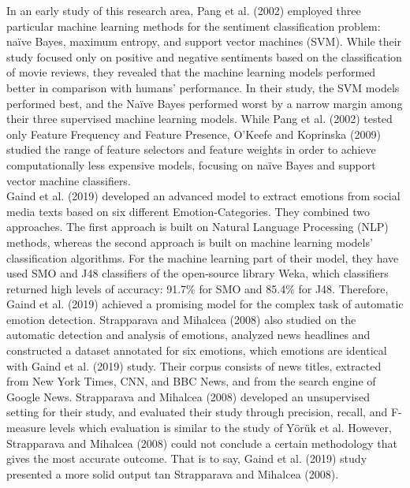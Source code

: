 \documentclass[a4paper]{article}
\begin{document}
In an early study of this research area, Pang et al. (2002) employed three particular machine learning methods for the sentiment classification problem: naïve Bayes, maximum entropy, and support vector machines (SVM). While their study focused only on positive and negative sentiments based on the classification of movie reviews, they revealed that the machine learning models performed better in comparison with humans’ performance. In their study, the SVM models performed best, and the Naïve Bayes performed worst by a narrow margin among their three supervised machine learning models. While Pang et al. (2002) tested only Feature Frequency and Feature Presence, O’Keefe and Koprinska (2009) studied the range of feature selectors and feature weights in order to achieve computationally less expensive models, focusing on naïve Bayes and support vector machine classifiers. \\
    
Gaind et al. (2019) developed an advanced model to extract emotions from social media texts based on six different Emotion-Categories. They combined two approaches. The first approach is built on Natural Language Processing (NLP) methods, whereas the second approach is built on machine learning models’ classification algorithms. For the machine learning part of their model, they have used SMO and J48 classifiers of the open-source library Weka, which classifiers returned high levels of accuracy: 91.7\% for SMO and 85.4\% for J48. Therefore, Gaind et al. (2019) achieved a promising model for the complex task of automatic emotion detection. Strapparava and Mihalcea (2008) also studied on the automatic detection and analysis of emotions, analyzed news headlines and constructed a dataset annotated for six emotions, which emotions are identical with Gaind et al. (2019) study. Their corpus consists of news titles, extracted from New York Times, CNN, and BBC News, and from the search engine of Google News. Strapparava and Mihalcea (2008) developed an unsupervised setting for their study, and evaluated their study through precision, recall, and F-measure levels which evaluation is similar to the study of Yörük et al. However, Strapparava and Mihalcea (2008) could not conclude a certain methodology that gives the most accurate outcome. That is to say, Gaind et al. (2019) study presented a more solid output tan Strapparava and Mihalcea (2008). \\
    
\end{document}

